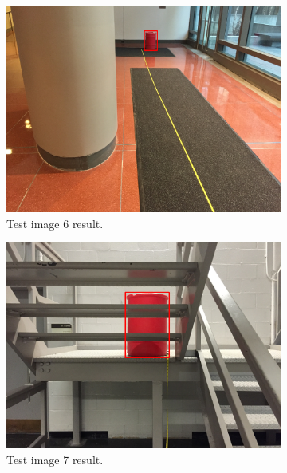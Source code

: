 \documentclass[a4paper]{article}
\begin{document}
\begin{figure}[!tbp]
  \centering
  \begin{subfigure}[b]{.4\textwidth}
    \includegraphics[width=1\textwidth]{test_image6.png}
\caption{\label{fig:test6}Test image 6 result.}
  \end{subfigure}
  \begin{subfigure}[b]{.4\textwidth}
    \includegraphics[width=1\textwidth]{test_image7.png}
\caption{\label{fig:test7}Test image 7 result.}
  \end{subfigure}
  \caption{\label{fig:test4_set}}
\end{figure}
\end{document}

